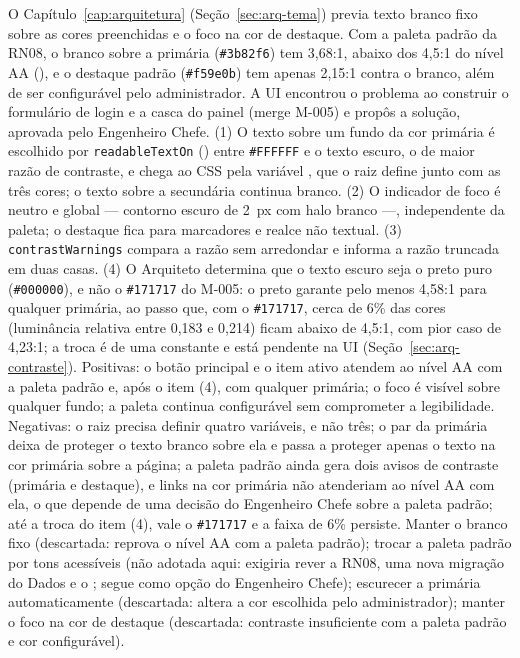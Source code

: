 {O Capítulo~\ref{cap:arquitetura} (Seção~\ref{sec:arq-tema}) previa texto branco fixo sobre as cores preenchidas e o foco na cor de destaque. Com a paleta padrão da RN08, o branco sobre a primária (\texttt{\#3b82f6}) tem 3,68:1, abaixo dos 4,5:1 do nível AA (), e o destaque padrão (\texttt{\#f59e0b}) tem apenas 2,15:1 contra o branco, além de ser configurável pelo administrador. A UI encontrou o problema ao construir o formulário de login e a casca do painel (merge M-005) e propôs a solução, aprovada pelo Engenheiro Chefe.}
{(1) O texto sobre um fundo da cor primária é escolhido por \texttt{readableTextOn} () entre \texttt{\#FFFFFF} e o texto escuro, o de maior razão de contraste, e chega ao CSS pela variável , que o  raiz define junto com as três cores; o texto sobre a secundária continua branco. (2) O indicador de foco é neutro e global --- contorno escuro de 2~px com halo branco ---, independente da paleta; o destaque fica para marcadores e realce não textual. (3) \texttt{contrastWarnings} compara a razão sem arredondar e informa a razão truncada em duas casas. (4) O Arquiteto determina que o texto escuro seja o preto puro (\texttt{\#000000}), e não o \texttt{\#171717} do M-005: o preto garante pelo menos 4,58:1 para qualquer primária, ao passo que, com o \texttt{\#171717}, cerca de 6\% das cores (luminância relativa entre 0,183 e 0,214) ficam abaixo de 4,5:1, com pior caso de 4,23:1; a troca é de uma constante e está pendente na UI (Seção~\ref{sec:arq-contraste}).}
{Positivas: o botão principal e o item ativo atendem ao nível AA com a paleta padrão e, após o item (4), com qualquer primária; o foco é visível sobre qualquer fundo; a paleta continua configurável sem comprometer a legibilidade. Negativas: o  raiz precisa definir quatro variáveis, e não três; o par da primária deixa de proteger o texto branco sobre ela e passa a proteger apenas o texto na cor primária sobre a página; a paleta padrão ainda gera dois avisos de contraste (primária e destaque), e links na cor primária não atenderiam ao nível AA com ela, o que depende de uma decisão do Engenheiro Chefe sobre a paleta padrão; até a troca do item (4), vale o \texttt{\#171717} e a faixa de 6\% persiste.}
{Manter o branco fixo (descartada: reprova o nível AA com a paleta padrão); trocar a paleta padrão por tons acessíveis (não adotada aqui: exigiria rever a RN08, uma nova migração do Dados e o ; segue como opção do Engenheiro Chefe); escurecer a primária automaticamente (descartada: altera a cor escolhida pelo administrador); manter o foco na cor de destaque (descartada: contraste insuficiente com a paleta padrão e cor configurável).}

